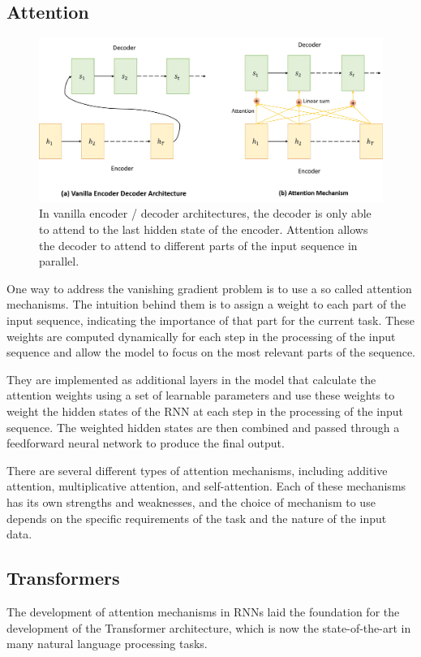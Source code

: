 \subsection{Attention}
\begin{figure}[h]
    \includegraphics[width=\linewidth]{chapters/NLP/figures/attention.png}
    \caption{In vanilla encoder / decoder architectures, the decoder is only able to attend to the last hidden state of the encoder. Attention allows the decoder to attend to different parts of the input sequence in parallel.}
    \label{fig:attention}
\end{figure}
One way to address the vanishing gradient problem is to use a so called attention mechanisms.
The intuition behind them is to assign a weight to each part of the input sequence, indicating the importance of that part for the current task.
These weights are computed dynamically for each step in the processing of the input sequence and allow the model to focus on the most relevant parts of the sequence.

They are implemented as additional layers in the model that calculate the attention weights using a set of learnable parameters and use these weights to weight the hidden states of the RNN at each step in the processing of the input sequence.
The weighted hidden states are then combined and passed through a feedforward neural network to produce the final output.

There are several different types of attention mechanisms, including additive attention, multiplicative attention, and self-attention. Each of these mechanisms has its own strengths and weaknesses, and the choice of mechanism to use depends on the specific requirements of the task and the nature of the input data.


\subsection{Transformers}
The development of attention mechanisms in RNNs laid the foundation for the development of the Transformer architecture, which is now the state-of-the-art in many natural language processing tasks.

